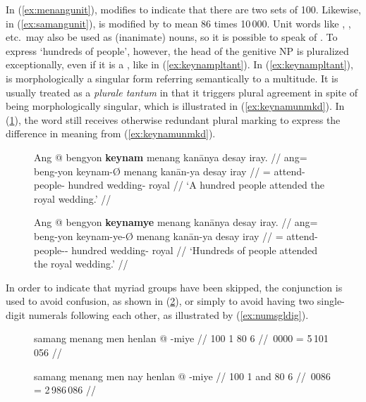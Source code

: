 In (\ref{ex:menangunit}),  modifies  to 
indicate that there are two sets of 100. Likewise, in 
(\ref{ex:samangunit}),  is modified by 
 to mean 86 times 10\,000.
Unit words like , , etc.\ may also be 
used as (inanimate) nouns, so it is possible to speak of 
.\label{hundreds} To express `hundreds of
people', however, the head of the genitive NP is pluralized exceptionally, even
if it is a , like  in
(\ref{ex:keynampltant}). In (\ref{ex:keynampltant}),  is
morphologically a singular form referring semantically to a multitude. It is
usually treated as a \textit{plurale tantum} in that it triggers plural
agreement in spite of being morphologically singular, which is illustrated in
(\ref{ex:keynamunmkd}). In (\ref{ex:keynammkd}), the word still receives
otherwise redundant plural marking to express the difference in meaning from
(\ref{ex:keynamunmkd}).

\begin{figure}[h]
\pex\label{ex:keynampltant}
\a\label{ex:keynamunmkd}\begingl
	\gla Ang @ bengyon \textbf{keynam} menang kanānya {desay iray}. //
	\glb ang= beng-yon keynam-Ø menang kanān-ya {desay iray} //
	\glc \AgtT{}= attend-\TplN{} people-\Top{} hundred wedding-\Loc{} 
		royal //
	\glft `A hundred people attended the royal wedding.' //
\endgl

\a\label{ex:keynammkd}\begingl
	\gla Ang @ bengyon \textbf{keynamye} menang kanānya {desay iray}. //
	\glb ang= beng-yon keynam-ye-Ø menang kanān-ya {desay iray} //
	\glc \AgtT{}= attend-\TplN{} people-\Pl{}-\Top{} hundred wedding-\Loc{} 
		royal //
	\glft `Hundreds of people attended the royal wedding.' //
\endgl
\xe
\end{figure}

In order to indicate that myriad groups have been skipped, the conjunction
 is used to avoid confusion, as shown in
(\ref{ex:numconfuse}), or simply to avoid having two single-digit numerals
following each other, as illustrated by (\ref{ex:numsgldig}).

\begin{figure}[h]
\pex[glwordalign=center]\label{ex:numconfuse}
\a\begingl
	\gla samang menang men henlan @ -miye //
	 {100} {1} {80} {6} //
	\,0000 = 5\,101\,056 //
\endgl

\a\begingl
	\gla samang menang men nay henlan @ -miye //
	 {100} {1} and {80} {6} //
	\,0086 = 2\,986\,086 //
\endgl
\xe
\end{figure}

